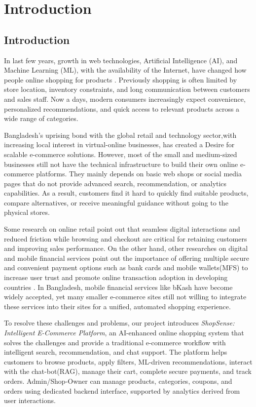 \chapter{Introduction}

\section{Introduction}
In last few years, growth in web technologies, Artificial Intelligence (AI), and Machine Learning (ML), with the availability of the Internet, have changed how people online shopping for products . Previously shopping is often limited by store location, inventory constraints, and long communication between customers and sales staff. Now a days, modern consumers increasingly expect convenience, personalized recommendations, and quick access to relevant products across a wide range of categories.

Bangladesh’s uprising bond with the global retail and technology sector,with increasing local interest in virtual-online businesses, has created a Desire for scalable e-commerce solutions. However, most of the small and medium-sized businesses still not have the technical infrastructure to build their own online e-commerce platforms. They mainly depends on basic web shops or social media pages that do not provide advanced search, recommendation, or analytics capabilities. As a result, customers find it hard to quickly find suitable products, compare alternatives, or receive meaningful guidance without going to the physical stores.

Some research on online retail point out that seamless digital interactions and reduced friction while browsing and checkout are critical for retaining customers and improving sales performance\cite{lee2020checkout}. On the other hand, other researches on digital and mobile financial services point out the importance of offering multiple secure and convenient payment options such as bank cards and mobile wallets(MFS) to increase user trust and promote online transaction adoption in developing countries \cite{hasan2021mobile}. In Bangladesh, mobile financial services like bKash have become widely accepted, yet many smaller e-commerce sites still not willing to integrate these services into their sites for a unified, automated shopping experience.


To resolve these challenges and problems, our project introduces \textit{ShopSense: Intelligent E-Commerce Platform}, an AI-enhanced online shopping system that solves the challenges and provide a traditional e-commerce workflow with intelligent search, recommendation, and chat support. The platform helps customers to browse products, apply filters, ML-driven recommendations, interact with the chat-bot(RAG), manage their cart, complete secure payments, and track orders. Admin/Shop-Owner can manage products, categories, coupons, and orders using dedicated backend interface, supported by analytics derived from user interactions.

